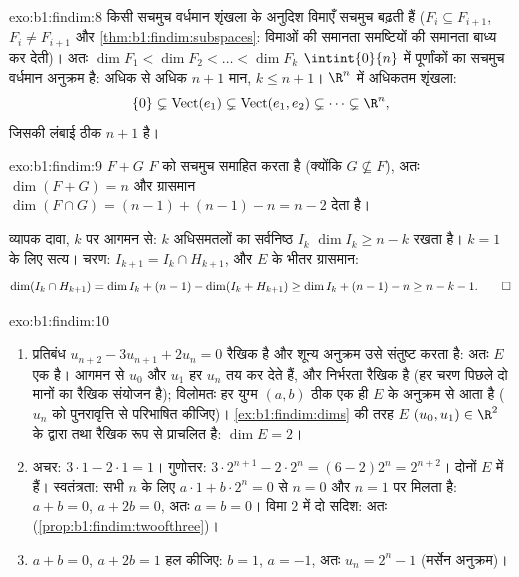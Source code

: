 \begin{solution}{exo:b1:findim:8}
किसी सचमुच वर्धमान शृंखला के अनुदिश विमाएँ सचमुच बढ़ती हैं ($F_i \subseteq
F_{i+1}$, $F_i \neq F_{i+1}$ और \cref{thm:b1:findim:subspaces}: विमाओं की
समानता समष्टियों की समानता बाध्य कर देती)। अतः $\dim F_1 < \dim F_2 < \dots
< \dim F_k$ $\intint{0}{n}$ में पूर्णांकों का सचमुच वर्धमान अनुक्रम है: अधिक
से अधिक $n + 1$ मान, $k \leq n + 1$। $\R^n$ में अधिकतम शृंखला:
\[
\{0\} \subsetneq \operatorname{Vect}(e_1) \subsetneq
\operatorname{Vect}(e_1, e_2) \subsetneq \dots \subsetneq \R^n ,
\]
जिसकी लंबाई ठीक $n + 1$ है।
\end{solution}

\begin{solution}{exo:b1:findim:9}
$F + G$ $F$ को सचमुच समाहित करता है (क्योंकि $G \not\subseteq F$), अतः
$\dim(F + G) = n$ और ग्रासमान $\dim(F \cap G) = (n-1) + (n-1) - n = n - 2$
देता है।

व्यापक दावा, $k$ पर आगमन से: $k$ अधिसमतलों का सर्वनिष्ठ $I_k$ $\dim I_k \geq
n - k$ रखता है। $k = 1$ के लिए सत्य। चरण: $I_{k+1} = I_k \cap H_{k+1}$, और
$E$ के भीतर ग्रासमान:
\[
\dim(I_k \cap H_{k+1}) = \dim I_k + (n - 1) - \dim(I_k + H_{k+1})
\geq \dim I_k + (n-1) - n \geq n - k - 1 . \qedhere
\]
\end{solution}

\begin{solution}{exo:b1:findim:10}
\begin{enumerate}
  \item प्रतिबंध $u_{n+2} - 3u_{n+1} + 2u_n = 0$ रैखिक है और शून्य अनुक्रम
  उसे संतुष्ट करता है: अतः $E$ एक  है। आगमन से $u_0$ और $u_1$ हर
  $u_n$ तय कर देते हैं, और निर्भरता रैखिक है (हर चरण पिछले दो मानों का रैखिक
  संयोजन है); विलोमतः हर युग्म $(a, b)$ ठीक एक ही $E$ के अनुक्रम से आता है
  ($u_n$ को पुनरावृत्ति से परिभाषित कीजिए)। \cref{ex:b1:findim:dims} की तरह
  $E$ $(u_0, u_1) \in \R^2$ के द्वारा  तथा रैखिक रूप से
  प्राचलित है: $\dim E = 2$।
  \item अचर: $3\cdot1 - 2\cdot1 = 1$। गुणोत्तर: $3\cdot 2^{n+1} - 2\cdot 2^n
  = (6 - 2)2^n = 2^{n+2}$। दोनों $E$ में हैं। स्वतंत्रता: सभी $n$ के लिए
  $a\cdot 1 + b\cdot 2^n = 0$ से $n = 0$ और $n = 1$ पर मिलता है: $a + b =
  0$, $a + 2b = 0$, अतः $a = b = 0$। विमा $2$ में दो  सदिश: अतः 
  (\cref{prop:b1:findim:twoofthree})।
  \item $a + b = 0$, $a + 2b = 1$ हल कीजिए: $b = 1$, $a = -1$, अतः $u_n =
  2^n - 1$ (मर्सेन अनुक्रम)।
\end{enumerate}
\end{solution}

